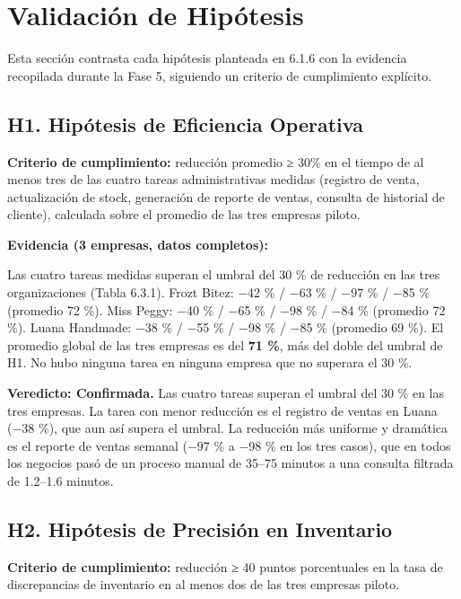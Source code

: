 \section{Validación de Hipótesis}\label{validaciuxf3n-de-hipuxf3tesis}

Esta sección contrasta cada hipótesis planteada en 6.1.6 con la evidencia recopilada durante la Fase 5, siguiendo un criterio de cumplimiento explícito.

\subsection{H1. Hipótesis de Eficiencia Operativa}\label{h1.-hipuxf3tesis-de-eficiencia-operativa}

\textbf{Criterio de cumplimiento:} reducción promedio ≥ 30\% en el tiempo de al menos tres de las cuatro tareas administrativas medidas (registro de venta, actualización de stock, generación de reporte de ventas, consulta de historial de cliente), calculada sobre el promedio de las tres empresas piloto.

\textbf{Evidencia (3 empresas, datos completos):}

Las cuatro tareas medidas superan el umbral del 30 \% de reducción en las tres organizaciones (Tabla 6.3.1). Frozt Bitez: −42 \% / −63 \% / −97 \% / −85 \% (promedio 72 \%). Miss Peggy: −40 \% / −65 \% / −98 \% / −84 \% (promedio 72 \%). Luana Handmade: −38 \% / −55 \% / −98 \% / −85 \% (promedio 69 \%). El promedio global de las tres empresas es del \textbf{71 \%}, más del doble del umbral de H1. No hubo ninguna tarea en ninguna empresa que no superara el 30 \%.

\textbf{Veredicto: Confirmada.} Las cuatro tareas superan el umbral del 30 \% en las tres empresas. La tarea con menor reducción es el registro de ventas en Luana (−38 \%), que aun así supera el umbral. La reducción más uniforme y dramática es el reporte de ventas semanal (−97 \% a −98 \% en los tres casos), que en todos los negocios pasó de un proceso manual de 35--75 minutos a una consulta filtrada de 1.2--1.6 minutos.

\subsection{H2. Hipótesis de Precisión en Inventario}\label{h2.-hipuxf3tesis-de-precisiuxf3n-en-inventario}

\textbf{Criterio de cumplimiento:} reducción ≥ 40 puntos porcentuales en la tasa de discrepancias de inventario en al menos dos de las tres empresas piloto.

